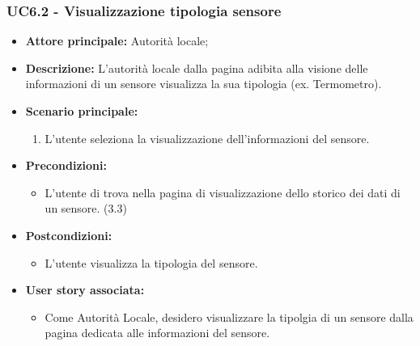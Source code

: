 \subsubsection{UC6.2 - Visualizzazione tipologia sensore}
\begin{itemize}
    \item \textbf{Attore principale:} Autorità locale;
    \item \textbf{Descrizione:} L’autorità locale dalla pagina adibita alla visione delle informazioni di un sensore visualizza la sua tipologia (ex. Termometro).
    \item \textbf{Scenario principale:}
    \begin{enumerate}
        \item L'utente seleziona la visualizzazione dell'informazioni del sensore.
    \end{enumerate}
\item \textbf{Precondizioni:}
    \begin{itemize}
        \item  L'utente di trova nella pagina di visualizzazione dello storico dei dati di un sensore. (3.3)
    \end{itemize}
    \item \textbf{Postcondizioni:}
          \begin{itemize}
              \item  L'utente visualizza la tipologia del sensore.
          \end{itemize}\item \textbf{User story associata:}
          \begin{itemize}
              \item Come Autorità Locale, desidero visualizzare la tipolgia di un sensore dalla pagina dedicata alle informazioni del sensore.
          \end{itemize}
\end{itemize}